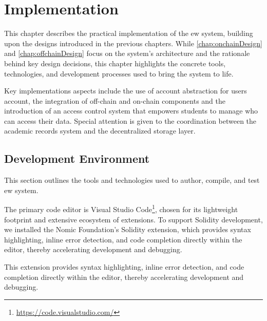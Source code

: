 \chapter{Implementation}
\label{chap:implementation}
This chapter describes the practical implementation of the \acrlong{ew} system, building upon the designs introduced in the previous chapters. While \cref{chap:onchainDesign} and \cref{chap:offchainDesign} focus on the system's architecture and the rationale behind key design decisions, this chapter highlights the concrete tools, technologies, and development processes used to bring the system to life.

Key implementations aspects include the use of account abstraction for users account, the integration of off-chain and on-chain components and the introduction of an access control system that empowers students to manage who can access their data. Special attention is given to the coordination between the academic records system and the decentralized storage layer. 

\section{Development Environment}
This section outlines the tools and technologies used to author, compile, and test \acrlong{ew} system.

The primary code editor is Visual Studio Code\footnote{\url{https://code.visualstudio.com/}}, chosen for its lightweight footprint and extensive ecosystem of extensions. To support Solidity development, we installed the Nomic Foundation's Solidity extension, which provides syntax highlighting, inline error detection, and code completion directly within the editor, thereby accelerating development and debugging.

This extension provides syntax highlighting, inline error detection, and code completion directly within the editor, thereby accelerating development and debugging.

